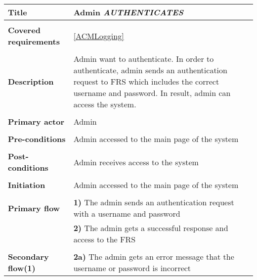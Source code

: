 \documentclass[a4paper,11pt]{article}
\begin{document}
\begin{tabular}{|p{3.5cm}|p{11.5cm}|} \hline
    \textbf{Title} &   Admin \emph{AUTHENTICATES}

    \\ \hline \rowcolor{Gray} & \\ \hline

    \textbf{Covered requirements} &  \ref{ACMLogging}

    \\ \hline \rowcolor{Gray} & \\ \hline

    \textbf{Description} &  Admin want to authenticate. In order to authenticate, admin sends an authentication request to FRS which includes the correct username and password. In result, admin can access the system.

    \\ \hline \rowcolor{Gray} & \\ \hline

    \textbf{Primary actor} & Admin

    \\ \hline \rowcolor{Gray} & \\ \hline

    \textbf{Pre-conditions} &   Admin accessed to the main page of the system

    \\ \hline \rowcolor{Gray} & \\ \hline

    \textbf{Post-conditions} &   Admin receives access to the system

    \\ \hline \rowcolor{Gray} & \\ \hline

    \textbf{Initiation} & Admin accessed to the main page of the system

    \\ \hline \rowcolor{Gray} & \\ \hline

    \textbf{Primary flow} &
    \textbf{1)} The admin sends an authentication request with a username and password  \\&
    \textbf{2)} The admin gets a successful response and access to the FRS

    \\ \hline \rowcolor{Gray} & \\ \hline

    \textbf{Secondary flow(1)} &
    \textbf{2a)} The admin gets an error message that the username or password is incorrect

    \\ \hline
\end{tabular}
\end{document}
